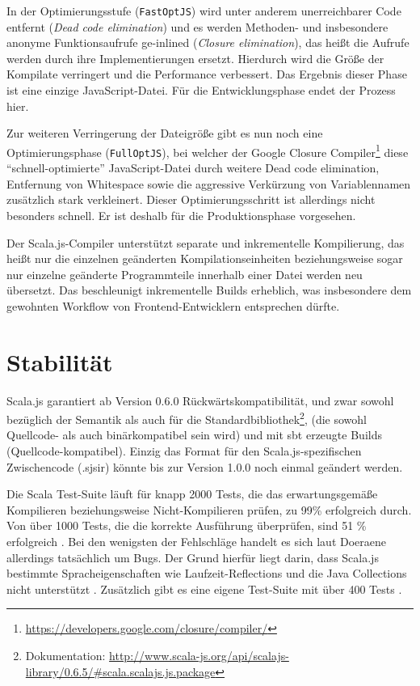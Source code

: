 \documentclass[a4paper, 12pt, hidelinks, listof=totoc, listoftables=totoc, bibliography=totoc]{scrreprt}
\newcommand{\code}[1]{\lstinline[language=Scala, style=inline]|#1|}
\begin{document}
In der Optimierungsstufe (\code{FastOptJS}) wird unter anderem unerreichbarer Code entfernt (\emph{Dead code elimination}) und es werden Methoden- und insbesondere anonyme Funktionsaufrufe ge-inlined (\emph{Closure elimination}), das heißt die Aufrufe werden durch ihre Implementierungen ersetzt. Hierdurch wird die Größe der Kompilate verringert und die Performance verbessert. Das Ergebnis dieser Phase ist eine einzige JavaScript-Datei. Für die Entwicklungsphase endet der Prozess hier.

Zur weiteren Verringerung der Dateigröße gibt es nun noch eine Optimierungsphase (\code{FullOptJS}), bei welcher der Google Closure Compiler\footnote{\url{https://developers.google.com/closure/compiler/}} diese "`schnell-optimierte"' JavaScript-Datei durch weitere Dead code elimination, Entfernung von Whitespace sowie die aggressive Verkürzung von Variablennamen zusätzlich stark verkleinert. Dieser Optimierungsschritt ist allerdings nicht besonders schnell. Er ist deshalb für die Produktionsphase vorgesehen. \cite{scalajs.DCO}\cite[\#HowCompilationWorks]{haoyi.HOS}

Der Scala.js-Compiler unterstützt separate und inkrementelle Kompilierung, das heißt nur die einzelnen geänderten Kompilationseinheiten beziehungsweise sogar nur einzelne geänderte Programmteile innerhalb einer Datei werden neu übersetzt. Das beschleunigt inkrementelle Builds erheblich, was insbesondere dem gewohnten Workflow von Frontend-Entwicklern entsprechen dürfte.


\section{Stabilität}

Scala.js garantiert ab Version 0.6.0 Rückwärtskompatibilität, und zwar sowohl bezüglich der Semantik als auch für die Standardbibliothek\footnote{Dokumentation: \url{http://www.scala-js.org/api/scalajs-library/0.6.5/\#scala.scalajs.js.package}}, (die sowohl Quellcode- als auch binärkompatibel sein wird) und mit sbt erzeugte Builds (Quellcode-kompatibel). Einzig das Format für den Scala.js-spezifischen Zwischencode (.sjsir) könnte bis zur Version 1.0.0 noch einmal geändert werden. \cite{doeraene2015.SNL}

Die Scala Test-Suite läuft für knapp 2000 Tests, die das erwartungsgemäße Kompilieren beziehungsweise Nicht-Kompilieren prüfen, zu 99\% erfolgreich durch. Von über 1000 Tests, die die korrekte Ausführung überprüfen, sind 51 \% erfolgreich \cite[Folie~36, Min.~35]{doeraene2014.WHB}. Bei den wenigsten der Fehlschläge handelt es sich laut Doeraene allerdings tatsächlich um Bugs. Der Grund hierfür liegt darin, dass Scala.js bestimmte Spracheigenschaften wie Laufzeit-Reflections und die Java Collections nicht unterstützt \cite[S.~7]{doeraene2013.TDI}. Zusätzlich gibt es eine eigene Test-Suite mit über 400 Tests \cite[Folie 36, Min. 35]{doeraene2014.WHB}.
\end{document}
